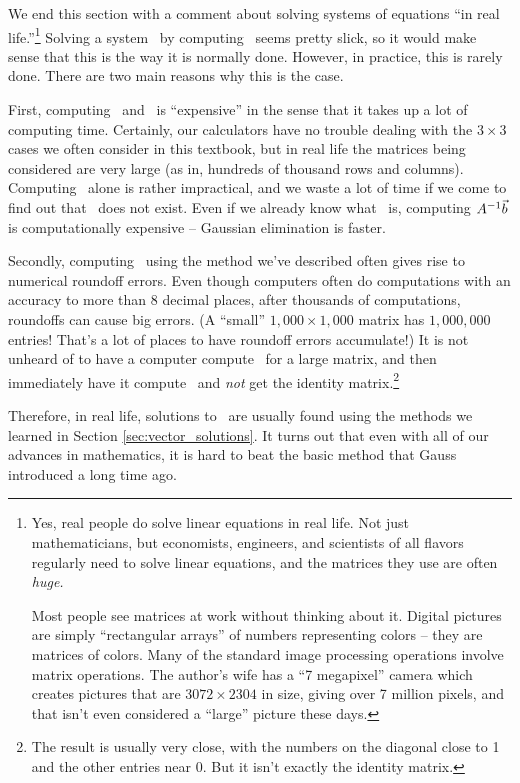 We end this section with a comment about solving systems of equations ``in real life.''\footnote{Yes, real people do solve linear equations in real life. Not just mathematicians, but economists, engineers, and scientists of all flavors regularly need to solve linear equations, and the matrices they use are often \textit{huge.}

Most people see matrices at work without thinking about it. Digital pictures are simply ``rectangular arrays'' of numbers representing colors -- they are matrices of colors. Many of the standard image processing operations involve matrix operations. The author's wife has a ``7 megapixel'' camera which creates pictures that are $3072\times 2304$ in size, giving over 7 million pixels, and that isn't even considered a ``large'' picture these days.} Solving a system \ttaxb\ by computing \ttai\vb\ seems pretty slick, so it would make sense that this is the way it is normally done. However, in practice, this is rarely done. There are two main reasons why this is the case.

First, computing \ttai\ and \ttai\vb\ is ``expensive'' in the sense that it takes up a lot of computing time. Certainly, our calculators have no trouble dealing with the $3 \times 3$ cases we often consider in this textbook, but in real life the matrices being considered are very large (as in, hundreds of thousand rows and columns). Computing \ttai\ alone is rather impractical, and we waste a lot of time if we come to find out that \ttai\ does not exist. Even if we already know what \ttai\ is, computing $A^{-1}\vec{b}$ is computationally expensive -- Gaussian elimination is faster.

Secondly, computing \ttai\ using the method we've described often gives rise to numerical roundoff errors. Even though computers often do computations with an accuracy to more than 8 decimal places, after thousands of computations, roundoffs can cause big errors. (A ``small'' $1,000 \times 1,000$ matrix has $1,000,000$ entries! That's a lot of places to have roundoff errors accumulate!) It is not unheard of to have a computer compute \ttai\ for a large matrix, and then immediately have it compute \tta\ttai\ and \textit{not} get the identity matrix.\footnote{The result is usually very close, with the numbers on the diagonal close to 1 and the other entries near 0. But it isn't exactly the identity matrix.}

Therefore, in real life, solutions to \ttaxb\ are usually found using the methods we learned in Section \ref{sec:vector_solutions}. It turns out that even with all of our advances in mathematics, it is hard to beat the basic method that Gauss introduced a long time ago. \\

